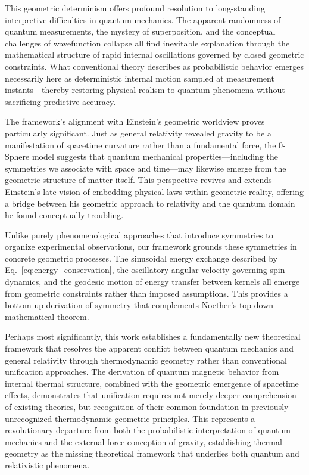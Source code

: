 \documentclass[%
 reprint,
 amsmath,amssymb,
 aps,
]{revtex4-1}
\numberwithin{equation}{section}%
\begin{document}
This geometric determinism offers profound resolution to long-standing interpretive difficulties in quantum mechanics. The apparent randomness of quantum measurements, the mystery of superposition, and the conceptual challenges of wavefunction collapse all find inevitable explanation through the mathematical structure of rapid internal oscillations governed by closed geometric constraints. What conventional theory describes as probabilistic behavior emerges necessarily here as deterministic internal motion sampled at measurement instants—thereby restoring physical realism to quantum phenomena without sacrificing predictive accuracy.

The framework's alignment with Einstein's geometric worldview proves particularly significant. Just as general relativity revealed gravity to be a manifestation of spacetime curvature rather than a fundamental force, the 0-Sphere model suggests that quantum mechanical properties—including the symmetries we associate with space and time—may likewise emerge from the geometric structure of matter itself. This perspective revives and extends Einstein's late vision of embedding physical laws within geometric reality, offering a bridge between his geometric approach to relativity and the quantum domain he found conceptually troubling.

Unlike purely phenomenological approaches that introduce symmetries to organize experimental observations, our framework grounds these symmetries in concrete geometric processes. The sinusoidal energy exchange described by Eq.~\eqref{eq:energy_conservation}, the oscillatory angular velocity governing spin dynamics, and the geodesic motion of energy transfer between kernels all emerge from geometric constraints rather than imposed assumptions. This provides a bottom-up derivation of symmetry that complements Noether's top-down mathematical theorem.

Perhaps most significantly, this work establishes a fundamentally new theoretical framework that resolves the apparent conflict between quantum mechanics and general relativity through thermodynamic geometry rather than conventional unification approaches. The derivation of quantum magnetic behavior from internal thermal structure, combined with the geometric emergence of spacetime effects, demonstrates that unification requires not merely deeper comprehension of existing theories, but recognition of their common foundation in previously unrecognized thermodynamic-geometric principles. This represents a revolutionary departure from both the probabilistic interpretation of quantum mechanics and the external-force conception of gravity, establishing thermal geometry as the missing theoretical framework that underlies both quantum and relativistic phenomena.
\end{document}
